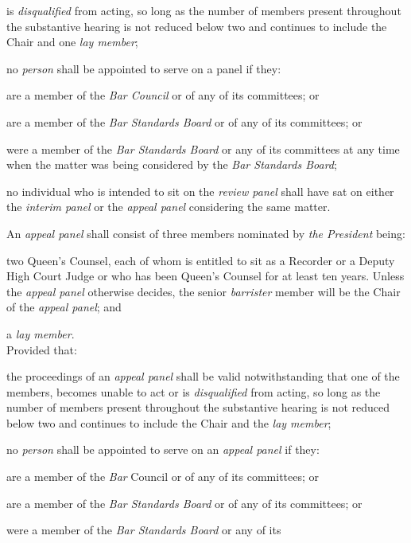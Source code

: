 is \emph{disqualified} from acting, so long as the number of members
present throughout the substantive hearing is not reduced below two and
continues to include the Chair and one \emph{lay member};\item no \emph{person} shall be appointed to serve on a panel if they:\al
\item are a member of the \emph{Bar Council} or of any of its committees;
or\\
\item are a member of the \emph{Bar Standards Board} or of any of its
committees; or\\
\item were a member of the \emph{Bar Standards Board} or any of its
committees at any time when the matter was being considered by
the \emph{Bar Standards Board};\la\item no individual who is intended to sit on the \emph{review panel} shall
have sat on either the \emph{interim panel} or the \emph{appeal
panel} considering the same matter.\ln
{}\par
An \emph{appeal panel} shall consist of three members nominated
by \emph{the President} being:\\\nl \item two Queen's Counsel, each of whom is entitled to sit as a Recorder or
a Deputy High Court Judge or who has been Queen's Counsel for at least
ten years. Unless the \emph{appeal panel} otherwise decides, the
senior \emph{barrister} member will be the Chair of the \emph{appeal
panel}; and\item a \emph{lay member}.\\
Provided that:\al
\item the proceedings of an \emph{appeal panel} shall be valid
notwithstanding that one of the members, becomes unable to act or
is \emph{disqualified} from acting, so long as the number of members
present throughout the substantive hearing is not reduced below two and
continues to include the Chair and the \emph{lay member};\\
\item no \emph{person} shall be appointed to serve on an \emph{appeal
panel} if they:\rl
\item are a member of the \emph{Bar }Council or of any of its committees;
or\\
\item are a member of the \emph{Bar Standards Board} or of any of its
committees; or\\
\item were a member of the \emph{Bar Standards Board} or any of its
